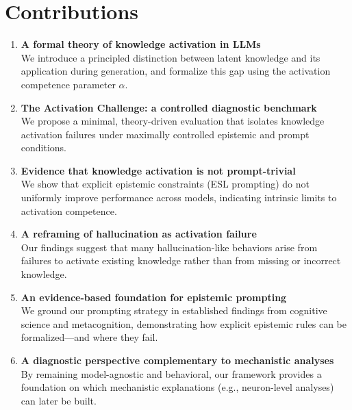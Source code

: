 \section*{Contributions}

\begin{enumerate}
    \item \textbf{A formal theory of knowledge activation in LLMs}\\
    We introduce a principled distinction between latent knowledge and its application during generation, and formalize this gap using the activation competence parameter $\alpha$.

    \item \textbf{The Activation Challenge: a controlled diagnostic benchmark}\\
    We propose a minimal, theory-driven evaluation that isolates knowledge activation failures under maximally controlled epistemic and prompt conditions.

    \item \textbf{Evidence that knowledge activation is not prompt-trivial}\\
    We show that explicit epistemic constraints (ESL prompting) do not uniformly improve performance across models, indicating intrinsic limits to activation competence.

    \item \textbf{A reframing of hallucination as activation failure}\\
    Our findings suggest that many hallucination-like behaviors arise from failures to activate existing knowledge rather than from missing or incorrect knowledge.

    \item \textbf{An evidence-based foundation for epistemic prompting}\\
    We ground our prompting strategy in established findings from cognitive science and metacognition, demonstrating how explicit epistemic rules can be formalized---and where they fail.

    \item \textbf{A diagnostic perspective complementary to mechanistic analyses}\\
    By remaining model-agnostic and behavioral, our framework provides a foundation on which mechanistic explanations (e.g., neuron-level analyses) can later be built.
\end{enumerate}




